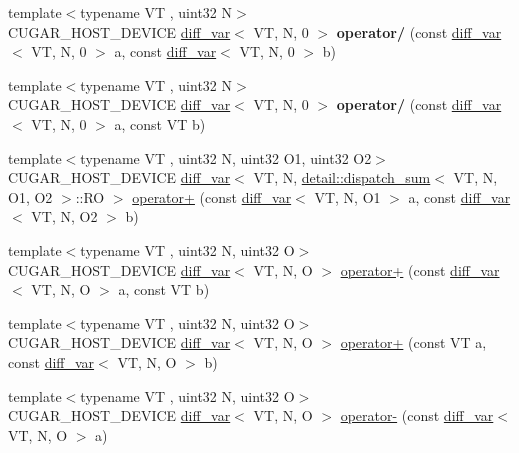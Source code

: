 \begin{DoxyCompactItemize}
\item 
{\footnotesize template$<$typename VT , uint32 N$>$ }\\C\+U\+G\+A\+R\+\_\+\+H\+O\+S\+T\+\_\+\+D\+E\+V\+I\+CE \hyperlink{structcugar_1_1diff__var}{diff\+\_\+var}$<$ VT, N, 0 $>$ {\bfseries operator/} (const \hyperlink{structcugar_1_1diff__var}{diff\+\_\+var}$<$ VT, N, 0 $>$ a, const \hyperlink{structcugar_1_1diff__var}{diff\+\_\+var}$<$ VT, N, 0 $>$ b)
\item 
{\footnotesize template$<$typename VT , uint32 N$>$ }\\C\+U\+G\+A\+R\+\_\+\+H\+O\+S\+T\+\_\+\+D\+E\+V\+I\+CE \hyperlink{structcugar_1_1diff__var}{diff\+\_\+var}$<$ VT, N, 0 $>$ {\bfseries operator/} (const \hyperlink{structcugar_1_1diff__var}{diff\+\_\+var}$<$ VT, N, 0 $>$ a, const VT b)
\item 
{\footnotesize template$<$typename VT , uint32 N, uint32 O1, uint32 O2$>$ }\\C\+U\+G\+A\+R\+\_\+\+H\+O\+S\+T\+\_\+\+D\+E\+V\+I\+CE \hyperlink{structcugar_1_1diff__var}{diff\+\_\+var}$<$ VT, N, \hyperlink{structcugar_1_1detail_1_1dispatch__sum}{detail\+::dispatch\+\_\+sum}$<$ VT, N, O1, O2 $>$\+::RO $>$ \hyperlink{group___auto_diff_module_ga47d435fca613a46396a9d551d12b7f16}{operator+} (const \hyperlink{structcugar_1_1diff__var}{diff\+\_\+var}$<$ VT, N, O1 $>$ a, const \hyperlink{structcugar_1_1diff__var}{diff\+\_\+var}$<$ VT, N, O2 $>$ b)
\item 
{\footnotesize template$<$typename VT , uint32 N, uint32 O$>$ }\\C\+U\+G\+A\+R\+\_\+\+H\+O\+S\+T\+\_\+\+D\+E\+V\+I\+CE \hyperlink{structcugar_1_1diff__var}{diff\+\_\+var}$<$ VT, N, O $>$ \hyperlink{group___auto_diff_module_gac73e44f611bc7ebbcf9d2e3492b81976}{operator+} (const \hyperlink{structcugar_1_1diff__var}{diff\+\_\+var}$<$ VT, N, O $>$ a, const VT b)
\item 
{\footnotesize template$<$typename VT , uint32 N, uint32 O$>$ }\\C\+U\+G\+A\+R\+\_\+\+H\+O\+S\+T\+\_\+\+D\+E\+V\+I\+CE \hyperlink{structcugar_1_1diff__var}{diff\+\_\+var}$<$ VT, N, O $>$ \hyperlink{group___auto_diff_module_gafde6513cdae3834b1bd130607df39356}{operator+} (const VT a, const \hyperlink{structcugar_1_1diff__var}{diff\+\_\+var}$<$ VT, N, O $>$ b)
\item 
{\footnotesize template$<$typename VT , uint32 N, uint32 O$>$ }\\C\+U\+G\+A\+R\+\_\+\+H\+O\+S\+T\+\_\+\+D\+E\+V\+I\+CE \hyperlink{structcugar_1_1diff__var}{diff\+\_\+var}$<$ VT, N, O $>$ \hyperlink{group___auto_diff_module_ga9f04070233d92db57d6d4287daf01702}{operator-\/} (const \hyperlink{structcugar_1_1diff__var}{diff\+\_\+var}$<$ VT, N, O $>$ a)

\end{DoxyCompactItemize}

